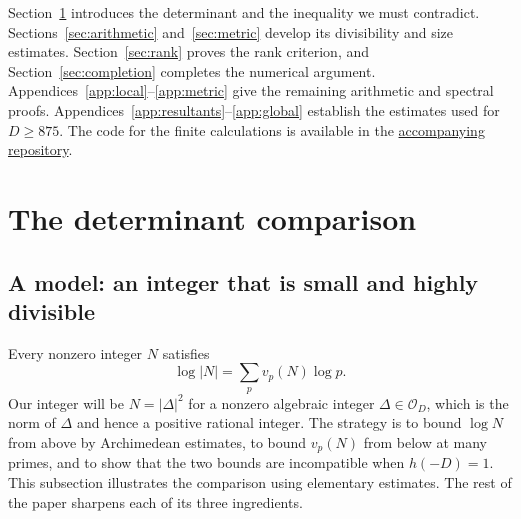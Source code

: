 Section~\ref{sec:comparison} introduces the determinant and the inequality
we must contradict. Sections~\ref{sec:arithmetic} and~\ref{sec:metric} develop
its divisibility and size estimates. Section~\ref{sec:rank} proves the rank
criterion, and Section~\ref{sec:completion} completes the numerical argument.
Appendices~\ref{app:local}--\ref{app:metric} give the remaining
arithmetic and spectral proofs. Appendices~\ref{app:resultants}--\ref{app:global}
establish the estimates used for $D\geq875$. The code for the finite
calculations is available in the
\href{https://github.com/dualverse-ai/tenth_discriminant/tree/main/bound-498/code}{accompanying repository}.

\section{The determinant comparison}\label{sec:comparison}

\subsection{A model: an integer that is small and highly divisible}
\label{subsec:model}

Every nonzero integer $N$ satisfies
\begin{equation}\label{eq:product-formula}
  \log|N|=\sum_p v_p(N)\log p .
\end{equation}
Our integer will be $N=|\Delta|^2$ for a nonzero algebraic integer $\Delta\in
\mathcal{O}_D$, which is the norm of $\Delta$ and hence a positive rational
integer. The strategy is to bound $\log N$ from above by Archimedean
estimates, to bound $v_p(N)$ from below at many primes, and to show that the
two bounds are incompatible when $h(-D)=1$. This subsection illustrates the comparison using elementary estimates. The rest of the paper sharpens each of its
three ingredients.

